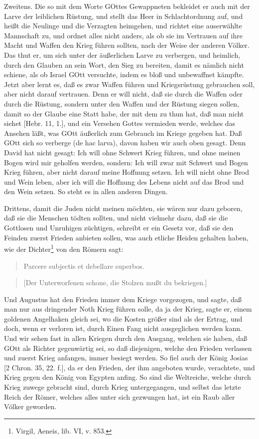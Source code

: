 Zweitens. Die so mit dem Worte GOttes Gewappneten bekleidet er auch mit der Larve der leiblichen Rüstung, und stellt das Heer in Schlachtordnung auf, und heißt die Neulinge und die Verzagten heimgehen, und richtet eine auserwählte Mannschaft zu, und ordnet alles nicht anders, als ob sie im Vertrauen auf ihre Macht und Waffen den Krieg führen sollten, nach der Weise der anderen Völker. Das thut er, um sich unter der äußerlichen Larve zu verbergen, und heimlich, durch den Glauben an sein Wort, den Sieg zu bereiten, damit es nämlich nicht schiene, als ob Israel GOtt versuchte, indem es bloß und unbewaffnet kämpfte. Jetzt
aber lernt es, daß es zwar Waffen führen und Kriegsrüstung gebrauchen soll, aber nicht darauf vertrauen. Denn er will nicht, daß sie durch die Waffen oder durch die Rüstung, sondern unter den Waffen und der Rüstung siegen sollen, damit so der Glaube eine Statt habe, der mit dem zu thun hat, daß man nicht siehet [Hebr. 11, 1.], und ein Versehen Gottes vermieden werde, welches das Ansehen läßt, was GOtt äußerlich zum Gebrauch im Kriege gegeben hat. Daß GOtt sich so verberge (de hac larva), davon haben wir auch oben gesagt. Denn David hat nicht gesagt: Ich will ohne Schwert Krieg führen, und ohne meinen Bogen wird mir geholfen werden, sondern: Ich will zwar mit Schwert und Bogen Krieg führen, aber nicht darauf meine Hoffnung setzen. Ich will nicht ohne Brod und Wein leben, aber ich will die Hoffnung des Lebens nicht auf das Brod und den Wein setzen. So steht es in allen anderen Dingen.

Drittens, damit die Juden nicht meinen möchten, sie wären nur dazu geboren, daß sie die Menschen tödten sollten, und nicht vielmehr dazu, daß sie die Gottlosen und Unruhigen züchtigen, schreibt er ein Gesetz vor, daß sie den Feinden zuerst Frieden anbieten sollen, was auch etliche Heiden gehalten haben, wie der Dichter\footnote{Virgil, Aeneis, lib. VI, v. 853.} von den Römern sagt:

\begin{quote}
Parcere subjectis et debellare superbos.
\end{quote}

\begin{quote}
[Der Unterworfenen schone, die Stolzen mußt du bekriegen.]
\end{quote}

Und Augustus hat den Frieden immer dem Kriege vorgezogen, und sagte, daß man nur aus dringender Noth Krieg führen solle, da ja der Krieg, sagte er, einem goldenen Angelhaken gleich sei, wo die Kosten größer sind als der Ertrag, und doch, wenn er verloren ist, durch Einen Fang nicht ausgeglichen werden kann. Und wir sehen fast in allen Kriegen durch den Ausgang, welchen sie haben, daß GOtt als Richter gegenwärtig sei, so daß diejenigen, welche den Frieden verlassen und zuerst Krieg anfangen, immer besiegt werden. So fiel auch der König Josias [2 Chron. 35, 22. f.], da er den Frieden, der ihm angeboten wurde, verachtete, und Krieg gegen den König von Egypten anfing. So sind die Weltreiche, welche durch Krieg zuwege gebracht sind, durch Krieg untergegangen, und selbst das letzte Reich der Römer, welches alles unter sich gezwungen hat, ist ein Raub aller Völker geworden.

